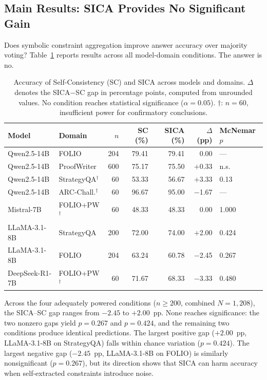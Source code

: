 \subsection{Main Results: SICA Provides No Significant Gain}
\label{sec:main-results}

Does symbolic constraint aggregation improve answer accuracy over majority voting? Table~\ref{tab:main_results} reports results across all model-domain conditions. The answer is no.

\begin{table}[t]
\centering
\small
\caption{Accuracy of Self-Consistency (SC) and SICA across models and domains. $\Delta$ denotes the SICA$-$SC gap in percentage points, computed from unrounded values. No condition reaches statistical significance ($\alpha = 0.05$). $\dagger$: $n=60$, insufficient power for confirmatory conclusions.}
\label{tab:main_results}
\begin{tabular}{@{}llrrrrl@{}}
\toprule
Model & Domain & $n$ & SC (\%) & SICA (\%) & $\Delta$ (pp) & McNemar $p$ \\
\midrule
Qwen2.5-14B & FOLIO & 204 & 79.41 & 79.41 & 0.00 & --- \\
Qwen2.5-14B & ProofWriter & 600 & 75.17 & 75.50 & $+$0.33 & n.s. \\
Qwen2.5-14B & StrategyQA$^\dagger$ & 60 & 53.33 & 56.67 & $+$3.33 & 0.13 \\
Qwen2.5-14B & ARC-Chall.$^\dagger$ & 60 & 96.67 & 95.00 & $-$1.67 & --- \\
Mistral-7B & FOLIO+PW$^\dagger$ & 60 & 48.33 & 48.33 & 0.00 & 1.000 \\
LLaMA-3.1-8B & StrategyQA & 200 & 72.00 & 74.00 & $+$2.00 & 0.424 \\
LLaMA-3.1-8B & FOLIO & 204 & 63.24 & 60.78 & $-$2.45 & 0.267 \\
DeepSeek-R1-7B & FOLIO+PW$^\dagger$ & 60 & 71.67 & 68.33 & $-$3.33 & 0.480 \\
\bottomrule
\end{tabular}
\end{table}

Across the four adequately powered conditions ($n \geq 200$, combined $N = 1{,}208$), the SICA--SC gap ranges from $-2.45$ to $+2.00$~pp. None reaches significance: the two nonzero gaps yield $p = 0.267$ and $p = 0.424$, and the remaining two conditions produce identical predictions. The largest positive gap ($+2.00$~pp, LLaMA-3.1-8B on StrategyQA) falls within chance variation ($p = 0.424$). The largest negative gap ($-2.45$~pp, LLaMA-3.1-8B on FOLIO) is similarly nonsignificant ($p = 0.267$), but its direction shows that SICA can harm accuracy when self-extracted constraints introduce noise.


